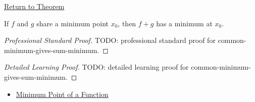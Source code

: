 \newpage
{}
\label{prf:common-minimum-gives-sum-minimum}

\begin{remark*}[Return]
\hyperref[thm:common-minimum-gives-sum-minimum]{Return to Theorem}
\end{remark*}

\begin{theorem*}
If \(f\) and \(g\) share a minimum point \(x_0\), then \(f+g\) has a minimum at \(x_0\).
\end{theorem*}

\begin{proof}[Professional Standard Proof]
\LRAProofBodyStart
TODO: professional standard proof for common-minimum-gives-sum-minimum.
\end{proof}

\begin{proof}[Detailed Learning Proof]
\LRAProofBodyStart
TODO: detailed learning proof for common-minimum-gives-sum-minimum.
\end{proof}

\begin{remark*}
\end{remark*}

\begin{dependencies}
\begin{itemize}
  \item \hyperref[def:function-minimum-point]{Minimum Point of a Function}
\end{itemize}
\end{dependencies}

\clearpage

